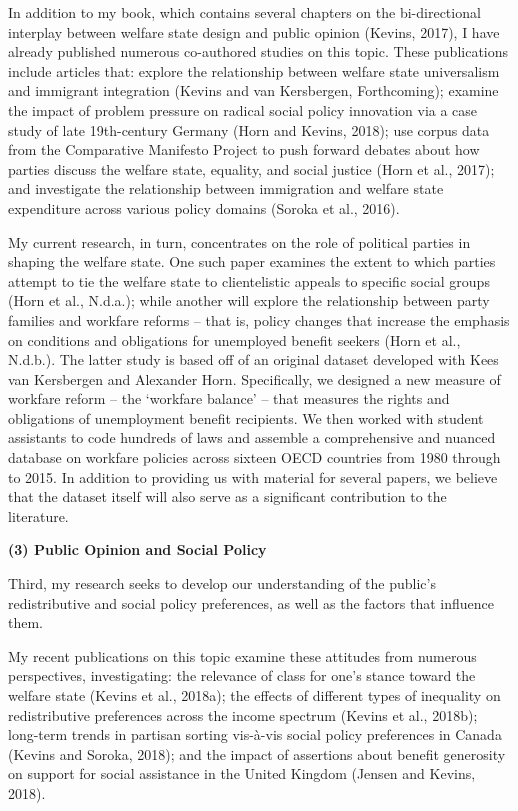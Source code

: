 \documentclass[letterpaper]{scrartcl}
\begin{document}
  In addition to my book, which contains several chapters on the bi-directional interplay between welfare state design and public opinion (Kevins, 2017), I have already published numerous co-authored studies on this topic. These publications include articles that: explore the relationship between welfare state universalism and immigrant integration (Kevins and van Kersbergen, Forthcoming); examine the impact of problem pressure on radical social policy innovation via a case study of late 19th-century Germany (Horn and Kevins, 2018); use corpus data from the Comparative Manifesto Project to push forward debates about how parties discuss the welfare state, equality, and social justice (Horn et al., 2017); and investigate the relationship between immigration and welfare state expenditure across various policy domains (Soroka et al., 2016).

  My current research, in turn, concentrates on the role of political parties in shaping the welfare state. One such paper examines the extent to which parties attempt to tie the welfare state to clientelistic appeals to specific social groups (Horn et al., N.d.a.); while another will explore the relationship between party families and workfare reforms -- that is, policy changes that increase the emphasis on conditions and obligations for unemployed benefit seekers (Horn et al., N.d.b.). The latter study is based off of an original dataset developed with Kees van Kersbergen and Alexander Horn. Specifically, we designed a new measure of workfare reform – the ‘workfare balance’ – that measures the rights and obligations of unemployment benefit recipients. We then worked with student assistants to code hundreds of laws and assemble a comprehensive and nuanced database on workfare policies across sixteen OECD countries from 1980 through to 2015. In addition to providing us with material for several papers, we believe that the dataset itself will also serve as a significant contribution to the literature.

  \textbf{(3) Public Opinion and Social Policy}
  \vspace{-1em}

  Third, my research seeks to develop our understanding of the public’s redistributive and social policy preferences, as well as the factors that influence them.

  My recent publications on this topic examine these attitudes from numerous perspectives, investigating: the relevance of class for one's stance toward the welfare state (Kevins et al., 2018a); the effects of different types of inequality on redistributive preferences across the income spectrum (Kevins et al., 2018b); long-term trends in partisan sorting vis-à-vis social policy preferences in Canada (Kevins and Soroka, 2018); and the impact of assertions about benefit generosity on support for social assistance in the United Kingdom (Jensen and Kevins, 2018).
\end{document}
